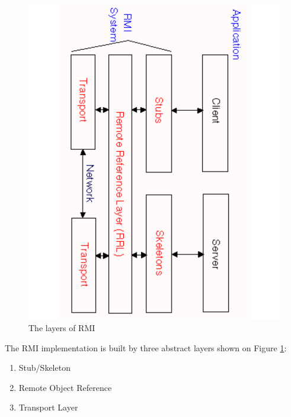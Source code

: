 \begin{figure}
\begin{center}
\includegraphics[angle=90, scale=0.65]{pictures/rmi.pdf}
\caption{The layers of RMI}
\label{RMIlayers}
\end{center}
\end{figure}

The RMI implementation is built by three abstract layers shown on Figure \ref{RMIlayers}:

\begin{enumerate}
\item Stub/Skeleton
\item Remote Object Reference
\item Transport Layer
\end{enumerate}

